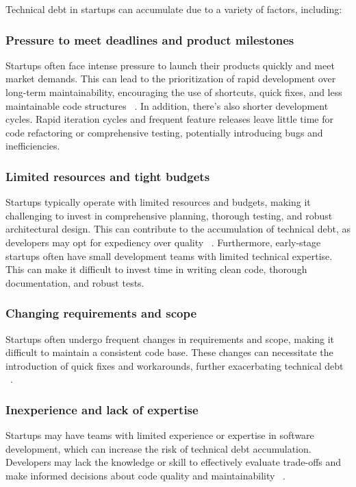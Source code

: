 Technical debt in startups can accumulate due to a variety of factors, including:
\subsubsection{Pressure to meet deadlines and product milestones}
Startups often face intense pressure to launch their products quickly and meet market demands. This can lead to the prioritization of rapid development over long-term maintainability, encouraging the use of shortcuts, quick fixes, and less maintainable code structures ~\cite{Klotins:2018:ETD,Qualityv77:online}. In addition, there's also shorter development cycles. Rapid iteration cycles and frequent feature releases leave little time for code refactoring or comprehensive testing, potentially introducing bugs and inefficiencies.

\subsubsection{Limited resources and tight budgets}
Startups typically operate with limited resources and budgets, making it challenging to invest in comprehensive planning, thorough testing, and robust architectural design. This can contribute to the accumulation of technical debt, as developers may opt for expediency over quality ~\cite{FowlerBottlenecks,Balancin62:online}. Furthermore, early-stage startups often have small development teams with limited technical expertise. This can make it difficult to invest time in writing clean code, thorough documentation, and robust tests.

\subsubsection{Changing requirements and scope}
Startups often undergo frequent changes in requirements and scope, making it difficult to maintain a consistent code base. These changes can necessitate the introduction of quick fixes and workarounds, further exacerbating technical debt ~\cite{DesignSt86:online,Creating18:online}.

\subsubsection{Inexperience and lack of expertise} 
Startups may have teams with limited experience or expertise in software development, which can increase the risk of technical debt accumulation. Developers may lack the knowledge or skill to effectively evaluate trade-offs and make informed decisions about code quality and maintainability ~\cite{Blog21:online}. 

